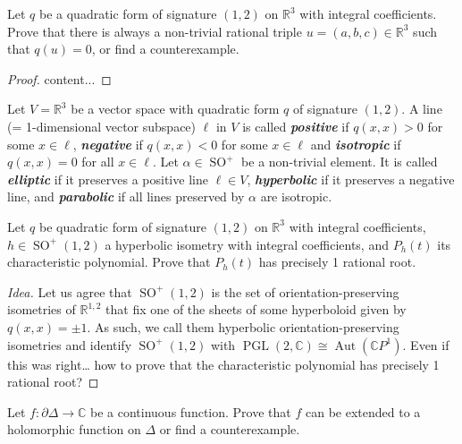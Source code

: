 \documentclass{article}
\numberwithin{equation}{section}
\newcommand{\R}{\mathbb{R}}
\newcommand{\C}{\mathbb{C}}
\DeclareMathOperator{\SO}{SO}
\DeclareMathOperator{\Aut}{Aut}
\DeclareMathOperator{\PGL}{PGL}
\begin{document}
\begin{exercise}
	Let $q$ be a quadratic form of signature $(1,2)$ on $\R^3$ with integral coefficients. Prove that there is always a non-trivial rational triple $u=(a,b,c)\in\R^3$ such that $q(u)=0$, or find a counterexample.
\end{exercise}
\begin{proof}
	content...
\end{proof}
\begin{defn}
	Let $V=\R^3$ be a vector space with quadratic form $q$ of signature $(1,2)$. A line (= 1-dimensional vector subspace) $\ell$ in $V$ is called \textbf{\textit{positive}} if $q(x,x)>0$ for some $x\in\ell$, \textbf{\textit{negative}} if $q(x,x)<0$ for some $x\in\ell$ and \textbf{\textit{isotropic}} if $q(x,x)=0$ for all $x\in\ell$. Let $\alpha\in\SO^+$ be a non-trivial element. It is called \textbf{\textit{elliptic}} if it preserves a positive line $\ell\in V$, \textbf{\textit{hyperbolic}} if it preserves a negative line, and \textbf{\textit{parabolic}} if all lines preserved by $\alpha$ are isotropic.
\end{defn}

\begin{exercise}
	Let $q$ be quadratic form of signature $(1,2)$ on $\R^3$ with integral coefficients, $h\in\SO^+(1,2)$ a hyperbolic isometry with integral coefficients, and $P_h(t)$ its characteristic polynomial. Prove that $P_h(t)$ has precisely 1 rational root.
\end{exercise}
\begin{proof}[Idea]
	Let us agree that $\SO^+(1,2)$ is the set of orientation-preserving isometries of $\R^{1,2}$ that fix one of the sheets of some hyperboloid given by $q(x,x)=\pm1$. As such, we call them hyperbolic orientation-preserving isometries and identify $\SO^+(1,2)$ with $\PGL(2,\C)\cong\Aut(\C P^1)$. {\color{magenta} Even if this was right… how to prove that the characteristic polynomial has precisely 1 rational root?}
\end{proof}
\begin{exercise}
	Let $f:\partial\Delta\to\C$ be a continuous function. Prove that $f$ can be extended to a holomorphic function on $\Delta$ or find a counterexample.
\end{exercise}
\end{document}
